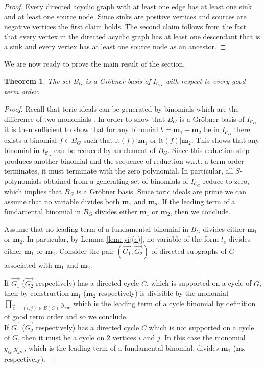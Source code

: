 \documentclass[11pt]{article}
\newtheorem{theo}{Theorem}[section]
\theoremstyle{definition}
\numberwithin{equation}{section}
\begin{document}
\begin{proof}
Every directed acyclic graph with at least one edge has at least one sink and at least one source node.  Since sinks are positive vertices and sources are negative vertices the first claim holds.  The second claim follows from the fact that every vertex in the directed acyclic graph has at least one descendant that is a sink and every vertex has at least one source node as an ancestor.
\end{proof}
We are now ready to prove the main result of the section.
\begin{theo}
\label{thm: gb}
    The set $B_G$ is a Gr\"{o}bner basis of $I_{\mathcal{C}_G}$ with respect to every good term order.
\end{theo}
\begin{proof}
     Recall that toric ideals can be generated by binomials which are the difference of two monomials \cite[Theorem 3.2]{binomial}. In order to show that $B_G$ is a Gr\"{o}bner basis of $I_{\mathcal{C}_G}$ it is then sufficient to show that for any binomial $b = \mathbf{m}_1 - \mathbf{m}_2$ be in $I_{\mathcal{C}_G}$ there exists a binomial $f\in B_G$ such that $\text{lt}(f)| \mathbf{m}_1$ or $\text{lt}(f)| \mathbf{m}_2$. This shows that any binomial in $I_{\mathcal{C}_G}$ can be reduced by an element of $B_G$. Since this reduction step produces another binomial and the sequence of reduction w.r.t. a term order terminates, it must terminate with the zero polynomial. In particular, all $S$-polynomials obtained from  a generating set of binomials of $I_{\mathcal{C}_G}$ reduce to zero, which implies that $B_G$ is a Gr\"{o}bner basis.
     Since toric ideals are prime we can assume that no variable divides both $\mathbf{m}_1$ and $\mathbf{m}_2$.
     If the leading term of a fundamental binomial in $B_G$ divides either $\mathbf{m}_1$ or $\mathbf{m}_2$, then we conclude.
     
     Assume that no leading term of a fundamental binomial in $B_G$ divides either $\mathbf{m}_1$ or $\mathbf{m}_2$. In particular, by Lemma \ref{lem: yij(e)}, no variable of the form $t_{e}$ divides either $\mathbf{m}_1$ or $\mathbf{m}_2$. Consider the pair $(\overrightarrow{G_1},\overrightarrow{G_2})$ of directed subgraphs of $G$ associated with $\mathbf{m}_1$ and $\mathbf{m}_2$.
     
If $\overrightarrow{G_1}$ ($\overrightarrow{G_2}$ respectively) has a directed cycle $C$, which is supported on a cycle of $G$, then  by construction $\mathbf{m}_1$ ($\mathbf{m}_2$ respectively) is divisible by the monomial $\prod_{\overset{\to}{e}=(i,j)\in E(C)}y_{ije}$ which is the leading term of a cycle binomial by definition of good term order and so we conclude.\\
If $\overrightarrow{G_1}$ ($\overrightarrow{G_2}$ respectively) has a directed cycle $C$ which is not supported on a cycle of $G$, then it must be a cycle on $2$ vertices $i$ and $j$. In this case the monomial $y_{ije}y_{jie}$, which is the leading term of a fundamental binomial, divides $\mathbf{m}_1$ ($\mathbf{m}_2$ respectively).
     

\end{proof}
\end{document}
